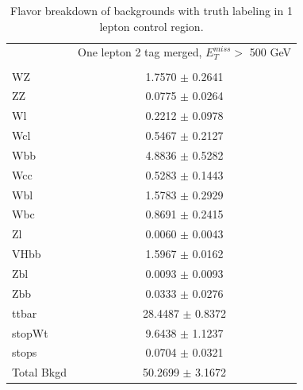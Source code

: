 \begin{table}
    \centering
    \tiny
    \begin{tabular}{l|c|}
        \cline{2-2}
        & \multicolumn{1}{c|}{One lepton 2 tag merged,  $E_{T}^{miss}$$ >$ 500 GeV}\\
        \\ \hline
        WZ   &  1.7570        $\pm$ 0.2641      \\ 
        ZZ   &  0.0775        $\pm$ 0.0264      \\ 
        Wl   &  0.2212        $\pm$ 0.0978      \\ 
        Wcl  &  0.5467        $\pm$ 0.2127      \\ 
        Wbb  &  4.8836        $\pm$ 0.5282      \\ 
        Wcc  &  0.5283        $\pm$ 0.1443      \\ 
        Wbl  &  1.5783        $\pm$ 0.2929      \\ 
        Wbc  &  0.8691        $\pm$ 0.2415      \\ 
        Zl   &  0.0060        $\pm$ 0.0043      \\ 
        VHbb  &  1.5967       $\pm$ 0.0162      \\ 
        Zbl  &  0.0093        $\pm$ 0.0093      \\ 
        Zbb  &  0.0333        $\pm$ 0.0276      \\ 
        ttbar&   28.4487      $\pm$ 0.8372    \\ 
        stopWt&    9.6438      $\pm$ 1.1237    \\ 
        stops&    0.0704      $\pm$ 0.0321    \\ 
        \hline
        Total Bkgd   &50.2699    $\pm$ 3.1672 
    \end{tabular}

    \caption{Flavor breakdown of backgrounds with truth labeling in 1 lepton control region.}
    \label{tab:fl1}

\end{table}    

